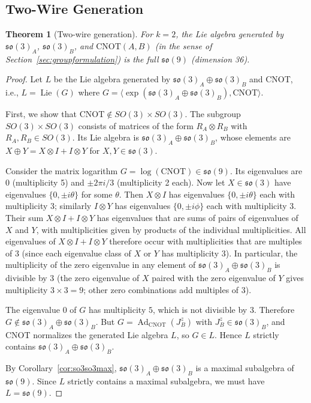 \documentclass[12pt,a4paper]{article}
\newtheorem{theorem}{Theorem}
\newcommand{\Ad}{\operatorname{Ad}}
\newcommand{\Lie}{\operatorname{Lie}}
\begin{document}
\subsection{Two-Wire Generation}

\begin{theorem}[Two-wire generation]
\label{thm:2wire}
For $k=2$, the Lie algebra generated by $\mathfrak{so}(3)_A$,
$\mathfrak{so}(3)_B$, and $\text{CNOT}(A,B)$ (in the sense of
Section~\ref{sec:groupformulation}) is the full $\mathfrak{so}(9)$
(dimension 36).
\end{theorem}

\begin{proof}
Let $L$ be the Lie algebra generated by $\mathfrak{so}(3)_A \oplus
\mathfrak{so}(3)_B$ and CNOT, i.e., $L = \Lie(G)$ where
$G = \langle \exp(\mathfrak{so}(3)_A \oplus \mathfrak{so}(3)_B),
\text{CNOT} \rangle$.

First, we show that $\text{CNOT} \notin SO(3) \times SO(3)$. The subgroup
$SO(3) \times SO(3)$ consists of matrices of the form $R_A \otimes R_B$
with $R_A,R_B \in SO(3)$. Its Lie algebra is $\mathfrak{so}(3)_A \oplus
\mathfrak{so}(3)_B$, whose elements are $X \oplus Y = X \otimes I + I \otimes Y$
for $X,Y \in \mathfrak{so}(3)$.

Consider the matrix logarithm $G = \log(\text{CNOT}) \in \mathfrak{so}(9)$.
Its eigenvalues are $0$ (multiplicity 5) and $\pm 2\pi i/3$ (multiplicity 2
each). Now let $X \in \mathfrak{so}(3)$ have eigenvalues $\{0, \pm i\theta\}$
for some $\theta$. Then $X \otimes I$ has eigenvalues $\{0, \pm i\theta\}$
each with multiplicity 3; similarly $I \otimes Y$ has eigenvalues
$\{0, \pm i\phi\}$ each with multiplicity 3. Their sum $X \otimes I + I \otimes Y$
has eigenvalues that are sums of pairs of eigenvalues of $X$ and $Y$, with
multiplicities given by products of the individual multiplicities. All
eigenvalues of $X \otimes I + I \otimes Y$ therefore occur with
multiplicities that are multiples of 3 (since each eigenvalue class of $X$
or $Y$ has multiplicity 3). In particular, the multiplicity of the zero
eigenvalue in any element of $\mathfrak{so}(3)_A \oplus \mathfrak{so}(3)_B$
is divisible by 3 (the zero eigenvalue of $X$ paired with the zero eigenvalue
of $Y$ gives multiplicity $3 \times 3 = 9$; other zero combinations add
multiples of 3).

The eigenvalue $0$ of $G$ has multiplicity $5$, which is not divisible by 3.
Therefore $G \notin \mathfrak{so}(3)_A \oplus \mathfrak{so}(3)_B$. But $G =
\Ad_{\text{CNOT}}(J_B^z)$ with $J_B^z \in \mathfrak{so}(3)_B$, and CNOT
normalizes the generated Lie algebra $L$, so $G \in L$. Hence $L$ strictly
contains $\mathfrak{so}(3)_A \oplus \mathfrak{so}(3)_B$.

By Corollary~\ref{cor:so3so3max}, $\mathfrak{so}(3)_A \oplus
\mathfrak{so}(3)_B$ is a maximal subalgebra of $\mathfrak{so}(9)$.
Since $L$ strictly contains a maximal subalgebra, we must have
$L = \mathfrak{so}(9)$.
\end{proof}
\end{document}
